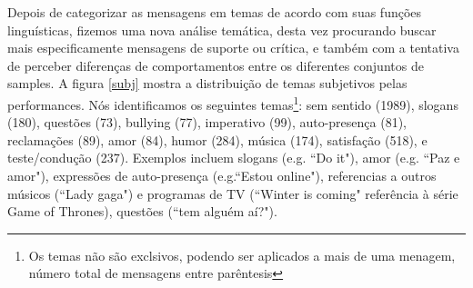 
Depois de categorizar as mensagens em temas de acordo com suas funções linguísticas, fizemos uma nova análise temática, desta vez procurando buscar mais especificamente mensagens de suporte ou crítica, e também com a tentativa de perceber diferenças de comportamentos entre os diferentes conjuntos de samples. A figura \ref{subj} mostra a distribuição de temas subjetivos pelas performances. Nós identificamos os seguintes temas\footnote{Os temas não são exclsivos, podendo ser aplicados a mais de uma menagem, número total de mensagens entre parêntesis}: sem sentido (1989), slogans (180), questões (73), bullying (77), imperativo (99), auto-presença (81), reclamações (89), amor (84), humor (284), música (174), satisfação (518), e teste/condução (237). Exemplos incluem slogans (e.g. ``Do it"), amor (e.g. ``Paz e amor"), expressões de auto-presença (e.g.``Estou online"), referencias a outros músicos (``Lady gaga") e programas de TV (``Winter is coming" referência à série Game of Thrones), questões (``tem alguém aí?"). 


